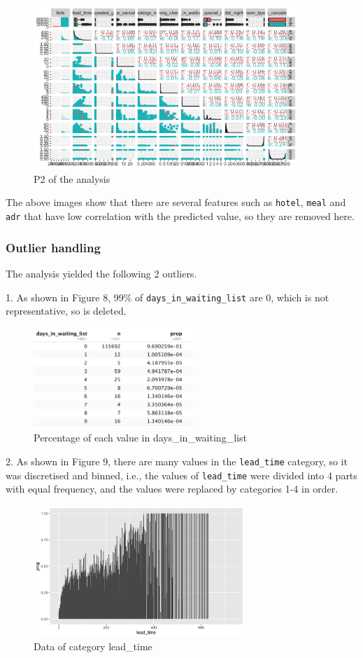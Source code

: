 \documentclass{article}
\begin{document}
\begin{figure}[h]
\centering
\includegraphics[width=10cm]{remain2.png} %
\caption{P2 of the analysis} %
\end{figure}

The above images show that there are several features such as \verb|hotel|, \verb|meal| and \verb|adr| that have low correlation with the predicted value, so they are removed here.


\subsubsection{Outlier handling}

The analysis yielded the following 2 outliers.

1. As shown in Figure 8, 99\% of \verb|days_in_waiting_list| are 0, which is not representative, so is deleted.

\begin{figure}[h]
\centering
\includegraphics[width=6cm]{days.png} %
\caption{Percentage of each value in days\_in\_waiting\_list} %
\end{figure}

2. As shown in Figure 9, there are many values in the \verb|lead_time| category, so it was discretised and binned, i.e., the values of \verb|lead_time| were divided into 4 parts with equal frequency, and the values were replaced by categories 1-4 in order.

\begin{figure}[h]
\centering
\includegraphics[width=8cm]{lead.png} %
\caption{Data of category lead\_time} %
\end{figure}
\end{document}
